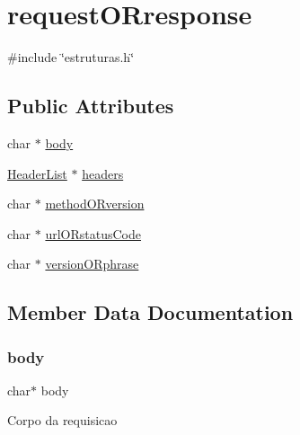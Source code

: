 \hypertarget{structrequestORresponse}{}\section{request\+O\+Rresponse}
\label{structrequestORresponse}


{\ttfamily \#include \char`\"{}estruturas.\+h\char`\"{}}

\subsection*{Public Attributes}
\begin{DoxyCompactItemize}
\item 
char $\ast$ \hyperlink{structrequestORresponse_a15ab326eb76ae067ffbf0e770b14350e}{body}
\item 
\hyperlink{estruturas_8h_a8a8b4f2337bacf921c5b455f8be7b6e4}{Header\+List} $\ast$ \hyperlink{structrequestORresponse_ae9f389a92bceaff82276efbd1d914eb4}{headers}
\item 
char $\ast$ \hyperlink{structrequestORresponse_aa1d8553b3a16d324fb272a867976c00d}{method\+O\+Rversion}
\item 
char $\ast$ \hyperlink{structrequestORresponse_ad622142f835fc5e4cf0e16123e2644c4}{url\+O\+Rstatus\+Code}
\item 
char $\ast$ \hyperlink{structrequestORresponse_a53a6db96ab378de64a27324ebdb8eab8}{version\+O\+Rphrase}
\end{DoxyCompactItemize}


\subsection{Member Data Documentation}
\mbox{\label{structrequestORresponse_a15ab326eb76ae067ffbf0e770b14350e}} 
\subsubsection{\texorpdfstring{body}{body}}
{\footnotesize\ttfamily char$\ast$ body}

Corpo da requisicao \mbox{\label{structrequestORresponse_ae9f389a92bceaff82276efbd1d914eb4}} 
